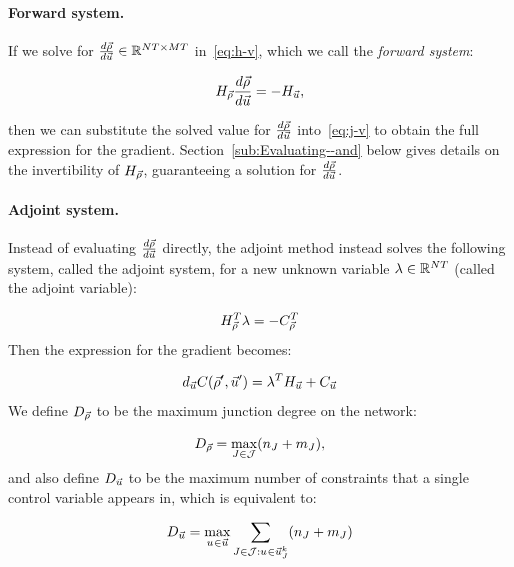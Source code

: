 \paragraph{Forward system.\label{par:Forward-system}}

If we solve for $\frac{d\vec{\rho}}{d\vec{u}}\in\mathbb{R}^{NT\times MT}$
in~\eqref{eq:h-v}, which we call the \emph{forward system}:

\[
H_{\vec{\rho}}\frac{d\vec{\rho}}{d\vec{u}}=-H_{\vec{u}},
\]


then we can substitute the solved value for $\frac{d\vec{\rho}}{d\vec{u}}$
into~\eqref{eq:j-v} to obtain the full expression for the gradient.
Section~\ref{sub:Evaluating--and} below gives details on the invertibility
of $H_{\vec{\rho}}$, guaranteeing a solution for $\frac{d\vec{\rho}}{d\vec{u}}$.


\paragraph{Adjoint system.\label{par:Adjoint-system}}

Instead of evaluating $\frac{d\vec{\rho}}{d\vec{u}}$ directly, the adjoint
method instead solves the following system, called the adjoint system,
for a new unknown variable $\lambda\in\mathbb{R}^{NT}$
(called the adjoint variable):

\begin{equation}
H_{\vec{\rho}}^{T}\lambda=-C_{\vec{\rho}}^{T}\label{eq:adjoint}
\end{equation}
Then the expression for the gradient becomes:

\begin{equation}
d_{\control}\cost\left(\nominal{\state},\nominal{\control}\right)=\lambda^{T}\Hu+\Ju\label{eq:adjoint-grad}
\end{equation}
We define $D_{\vec{\rho}}$ to be the maximum junction degree on
the network:

\begin{equation}
\degree{\state}=\max_{\jn\in\jns}\left(\ninc_{\jn}+\nout_{\jn}\right),\label{eq:dx}
\end{equation}
and also define $D_{\vec{u}}$ to be the maximum number of constraints
that a single control variable appears in, which is equivalent to:

\begin{equation}
\degree{\control}=\max_{\condiscrete{}{}\in\control}\sum_{\jn\in\jns:\condiscrete{}{}\in\junccon{\jn}{\tind}}\left(\ninc_{\jn}+\nout_{\jn}\right)\label{eq:dv}
\end{equation}


